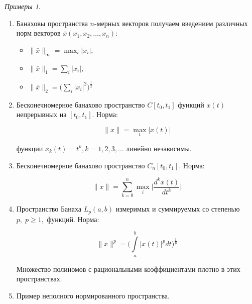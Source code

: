 \documentclass[12pt,a4paper,titlepage,oneside]{book}
\theoremstyle{definition}
\theoremstyle{plain}
\theoremstyle{break}
\theoremstyle{remark}
\theoremstyle{remark}
\theoremstyle{remark}
\newtheorem*{examples}{Примеры}
\theoremstyle{remark}
\theoremstyle{plain}
\theoremstyle{plain}
\begin{document}
\begin{examples}
\leavevmode
\begin{enumerate}

	\item Банаховы пространства $n$-мерных векторов получаем введением различных норм векторов $\bar{x}(x_1,x_2,\ldots,x_n)$:

	\begin{itemize}

		\item $\lVert \bar{x}\rVert_\infty=\displaystyle\max_{i}\lvert x_i\rvert$,

		\item $\lVert \bar{x}\rVert_1 = \displaystyle\sum_{i}\lvert x_i\rvert$,

		\item $\lVert \bar{x}\rVert_2 = \Big( \displaystyle\sum_{i}\lvert x_i\rvert^2 \Big)^{\frac{1}{2}}$

	\end{itemize}

	\item Бесконечномерное банахово пространство $C[t_0,t_1]$ функций $x(t)$ непрерывных на $[t_0,t_1]$. Норма:

	\begin{equation*}
	\lVert x\rVert = \displaystyle\max_{t}\lvert x(t)\rvert
	\end{equation*}

	функции $x_k(t)=t^k, k=1,2,3,\ldots$ линейно независимы.

	\item Бесконечномерное банахово пространство $C_n[t_0,t_1]$. Норма:

	\begin{equation*}
	\lVert x\rVert = \displaystyle\sum_{k=0}^n\max_{i}\lvert\frac{d^kx(t)}{dt^k}\rvert
	\end{equation*}

	\item Пространство Банаха $L_p(a,b)$ измеримых и суммируемых со степенью $p,\;p \geqslant 1,$ функций. Норма:

	\begin{equation*}
	\lVert x\rVert^p = \Big(\int\limits_a^b\lvert x(t)\rvert^p dt \Big)^{\frac{1}{p}}
	\end{equation*}

	Множество полиномов с рациональными коэффициентами плотно в этих пространствах.

	\item Пример неполного нормированного пространства.


\end{enumerate}
\end{examples}
\end{document}
